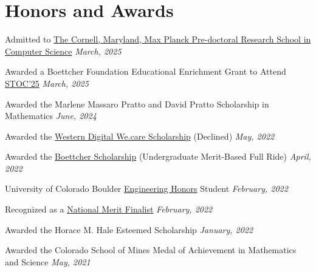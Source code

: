 \documentclass[a4paper,20pt]{article}
\begin{document}
  \section{Honors and Awards}
  \begin{description}[font=$\bullet$]
  \item Admitted to \href{https://cmmrs.mpi-sws.org}{The Cornell, Maryland, Max Planck Pre-doctoral Research School in Computer Science} \hfill \textit{March, 2025}
  \vspace{-5pt}
  \item Awarded a Boettcher Foundation Educational Enrichment Grant to Attend \href{https://acm-stoc.org/stoc2025/}{STOC'25} \hfill \textit{March, 2025}
  \vspace{-5pt}
  \item {Awarded the Marlene Massaro Pratto and David Pratto Scholarship in Mathematics \hfill \textit{June, 2024}}
  \vspace{-5pt}
  \item {Awarded the \href{https://scholarshipamerica.org/scholarship/westerndigital-wecare/}{Western Digital We.care Scholarship} (Declined) \hfill \textit{May, 2022}}
  \vspace{-5pt}
  \item {Awarded the \href{https://boettcherfoundation.org}{Boettcher Scholarship} (Undergraduate Merit-Based Full Ride) \hfill \textit{April, 2022}}
  \vspace{-5pt}
  \item {University of Colorado Boulder \href{https://cuengineeringhonors.com}{Engineering Honors} Student \hfill \textit{February, 2022}}
  \vspace{-5pt}
  \item {Recognized as a \href{https://www.nationalmerit.org}{National Merit Finalist} \hfill \textit{February, 2022}}
  \vspace{-5pt}
  \item {Awarded the Horace M. Hale Esteemed Scholarship \hfill \textit{January, 2022}}
  \vspace{-5pt}
  \item {Awarded the Colorado School of Mines Medal of Achievement in Mathematics and Science \hfill \textit{May, 2021}}
  \end{description}
\end{document}

